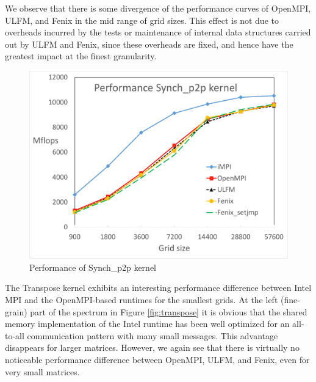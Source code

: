 We observe that there is some divergence of the performance curves of
OpenMPI, ULFM, and Fenix in the mid range of grid sizes.
This effect is not due to overheads incurred by the tests or maintenance
of internal data structures carried out by ULFM and Fenix, since these
overheads are fixed, and hence have the greatest impact at the finest
granularity.

\begin{figure}
  \centering
  \includegraphics[width=\columnwidth]{p2p_overheads-crop.pdf}
  \caption{Performance of Synch\_p2p kernel}
  \label{fig:p2p}
\end{figure}

The Transpose kernel exhibits an interesting performance difference between
Intel MPI and the OpenMPI-based runtimes for the smallest grids.
At the left (fine-grain) part of the spectrum in Figure \ref{fig:transpose}
it is obvious that the shared memory implementation of the Intel runtime has
been well optimized for an all-to-all communication pattern with many small
messages.
This advantage disappears for larger matrices.
However, we again see that there is virtually no noticeable performance
difference between OpenMPI, ULFM, and Fenix, even for very small matrices.

